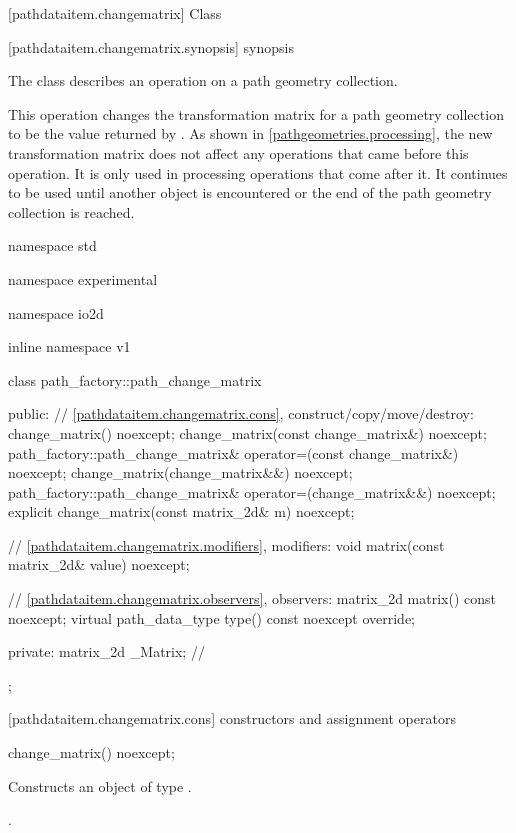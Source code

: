  [pathdataitem.changematrix] {Class }

 [pathdataitem.changematrix.synopsis] { synopsis}

\pnum
{}
The class  describes an operation on a path geometry collection.

\pnum
This operation changes the transformation matrix for a path geometry collection to be the value returned by . As shown in \ref{pathgeometries.processing}, the new transformation matrix does not affect any operations that came before this operation. It is only used in processing operations that come after it. It continues to be used until another  object is encountered or the end of the path geometry collection is reached.

\begin{codeblock}
namespace std { namespace experimental { namespace io2d { inline namespace v1 {
  class path_factory::path_change_matrix {
  public:
    // \ref{pathdataitem.changematrix.cons}, construct/copy/move/destroy:
    change_matrix() noexcept;
    change_matrix(const change_matrix&) noexcept;
    path_factory::path_change_matrix& operator=(const change_matrix&) noexcept;
    change_matrix(change_matrix&&) noexcept;
    path_factory::path_change_matrix& operator=(change_matrix&&) noexcept;
    explicit change_matrix(const matrix_2d& m) noexcept;

    // \ref{pathdataitem.changematrix.modifiers}, modifiers:
    void matrix(const matrix_2d& value) noexcept;

    // \ref{pathdataitem.changematrix.observers}, observers:
    matrix_2d matrix() const noexcept;
    virtual path_data_type type() const noexcept override;
    
  private:
    matrix_2d _Matrix; // \expos
  };
} } } }
\end{codeblock}

 [pathdataitem.changematrix.cons] { constructors and assignment operators}

\begin{itemdecl}
    change_matrix() noexcept;
\end{itemdecl}
\begin{itemdescr}
	\pnum
	\effects
	Constructs an object of type .
	
	\pnum
	\postconditions
	.
\end{itemdescr}

